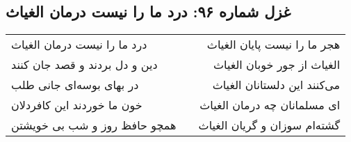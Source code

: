 \begin{center}
\section*{غزل شماره ۹۶: درد ما را نیست درمان الغیاث}
\label{sec:sh096}
\begin{longtable}{l p{0.5cm} r}
درد ما را نیست درمان الغیاث
&&
هجر ما را نیست پایان الغیاث
\\
دین و دل بردند و قصد جان کنند
&&
الغیاث از جور خوبان الغیاث
\\
در بهای بوسه‌ای جانی طلب
&&
می‌کنند این دلستانان الغیاث
\\
خون ما خوردند این کافردلان
&&
ای مسلمانان چه درمان الغیاث
\\
همچو حافظ روز و شب بی خویشتن
&&
گشته‌ام سوزان و گریان الغیاث
\\
\end{longtable}
\end{center}
